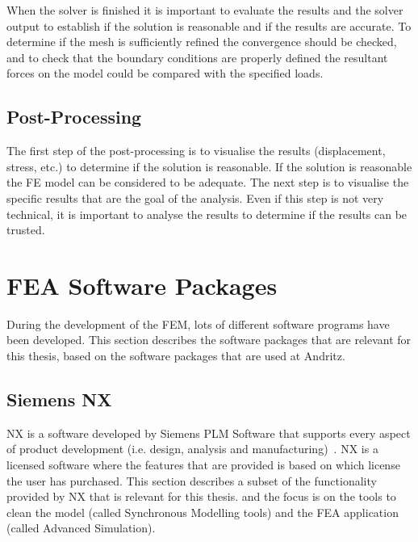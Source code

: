 When the solver is finished it is important to evaluate the results and the solver output to establish if the solution is reasonable and if the results are accurate. To determine if the mesh is sufficiently refined the convergence should be checked, and to check that the boundary conditions are properly defined the resultant forces on the model could be compared with the specified loads.~\cite[p.~303-324]{adams99}

\subsection{Post-Processing} %
\label{sub:post_processing}
The first step of the post-processing is to visualise the results (displacement, stress, etc.) to determine if the solution is reasonable. If the solution is reasonable the FE model can be considered to be adequate. The next step is to visualise the specific results that are the goal of the analysis. Even if this step is not very technical, it is important to analyse the results to determine if the results can be trusted.


\section{FEA Software Packages} %
\label{sec:fea_software_packages}
During the development of the FEM, lots of different software programs have been developed. This section describes the software packages that are relevant for this thesis, based on the software packages that are used at Andritz.

\subsection{Siemens NX} %
\label{sub:siemens_nx}
NX\texttrademark{} is a software developed by Siemens PLM Software that supports every aspect of product development (i.e. design, analysis and manufacturing)~\cite{siemensnx}. NX is a licensed software where the features that are provided is based on which license the user has purchased. This section describes a subset of the functionality provided by NX that is relevant for this thesis. and the focus is on the tools to clean the model (called Synchronous Modelling  tools) and the FEA application (called Advanced Simulation).~\cite[p.~36ff.]{goncharov14}

